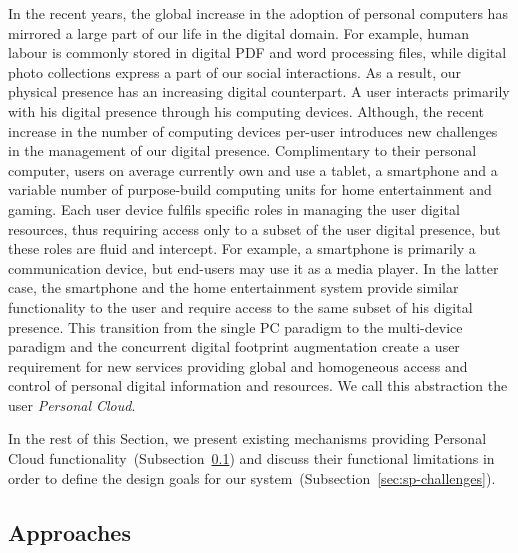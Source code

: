 In the recent years, the global increase in the adoption of personal computers
has mirrored a large part of our life in the digital domain. For example, human
labour is commonly stored in digital PDF and word processing files, while
digital photo collections express a part of our social interactions.  As a
result, our physical presence has an increasing digital counterpart. A user
interacts primarily with his digital presence through his computing devices.
Although, the recent increase in the number of computing devices per-user
introduces new challenges in the management of our digital presence.
Complimentary to their personal computer, users on average currently own and use
a tablet, a smartphone and a variable number of purpose-build computing units
for home entertainment and gaming.  Each user device fulfils specific roles in
managing the user digital resources, thus requiring access only to a subset of
the user digital presence, but these roles are fluid and intercept.  For
example, a smartphone is primarily a communication device, but end-users may use
it as a media player. In the latter case, the smartphone and the home
entertainment system provide similar functionality to the user and require
access to the same subset of his digital presence. This transition from the
single PC paradigm to the multi-device paradigm and the concurrent digital
footprint augmentation create a user requirement for new services providing
global and homogeneous access and control of personal digital information and
resources. We call this abstraction the user \emph{Personal Cloud}. 

In the rest of this Section, we present existing mechanisms providing Personal
Cloud functionality~(Subsection~\ref{sec:sp-approaches}) and discuss their
functional limitations in order to define the design goals for our \signpost
system~(Subsection~\ref{sec:sp-challenges}). 

\subsection{Approaches} \label{sec:sp-approaches}


